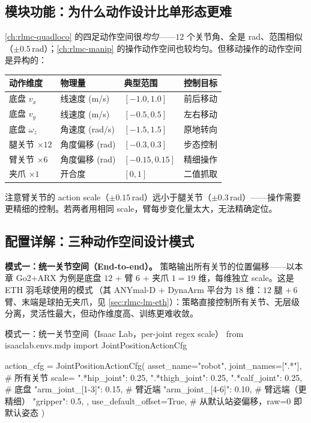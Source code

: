 \subsection{模块功能：为什么动作设计比单形态更难}
\label{sec:rlmc-lm-action-why}

\cref{ch:rlmc-quadloco} 的四足动作空间很\emph{均匀}——$12$ 个关节角、全是 rad、范围相似（$\pm0.5\,$rad）；\cref{ch:rlmc-manip} 的操作动作空间也较均匀。但移动操作的动作空间是异构的：

\begin{center}
\small
\begin{tabular}{@{}llll@{}}
\toprule
动作维度 & 物理量 & 典型范围 & 控制目标 \\
\midrule
底盘 $v_x$ & 线速度 (m/s) & $[-1.0, 1.0]$ & 前后移动 \\
底盘 $v_y$ & 线速度 (m/s) & $[-0.5, 0.5]$ & 左右移动 \\
底盘 $\omega_z$ & 角速度 (rad/s) & $[-1.5, 1.5]$ & 原地转向 \\
腿关节 $\times 12$ & 角度偏移 (rad) & $[-0.3, 0.3]$ & 步态控制 \\
臂关节 $\times 6$ & 角度偏移 (rad) & $[-0.15, 0.15]$ & 精细操作 \\
夹爪 $\times 1$ & 开合度 & $[0, 1]$ & 二值抓取 \\
\bottomrule
\end{tabular}
\end{center}

注意臂关节的 action scale（$\pm0.15\,$rad）远小于腿关节（$\pm0.3\,$rad）——操作需要更精细的控制。若两者用相同 scale，臂每步变化量太大，无法精确定位。

\subsection{配置详解：三种动作空间设计模式}
\label{sec:rlmc-lm-action-modes}

\textbf{模式一：统一关节空间（End-to-end）。} 策略输出所有关节的位置偏移——以本章 Go2+ARX 为例是底盘 $12$ + 臂 $6$ + 夹爪 $1=19$ 维，每维独立 scale。这是 ETH 羽毛球使用的模式\,\cite{ma2025badminton}（其 ANYmal-D + DynaArm 平台为 $18$ 维：$12$ 腿 $+\,6$ 臂、末端是球拍无夹爪，见 \cref{sec:rlmc-lm-eth}）：策略直接控制所有关节、无层级分离，灵活性最大，但动作维度高、训练更难收敛。

\begin{codebox}[Python]{模式一：统一关节空间（Isaac Lab，per-joint regex scale）}
from isaaclab.envs.mdp import JointPositionActionCfg

action_cfg = JointPositionActionCfg(
    asset_name="robot",
    joint_names=[".*"],                  # 所有关节
    scale={
        ".*hip_joint": 0.25, ".*thigh_joint": 0.25, ".*calf_joint": 0.25,  # 底盘
        "arm_joint_[1-3]": 0.15,         # 臂近端
        "arm_joint_[4-6]": 0.10,         # 臂远端（更精细）
        "gripper": 0.5,
    },
    use_default_offset=True,             # 从默认站姿偏移，raw=0 即默认姿态
)
\end{codebox}

